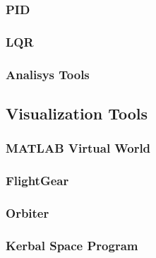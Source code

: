 \subsubsection{PID}
\subsubsection{LQR}
\subsubsection{Analisys Tools}
\subsection{Visualization Tools}
\subsubsection{MATLAB Virtual World}
\subsubsection{FlightGear}
\subsubsection{Orbiter}
\subsubsection{Kerbal Space Program}